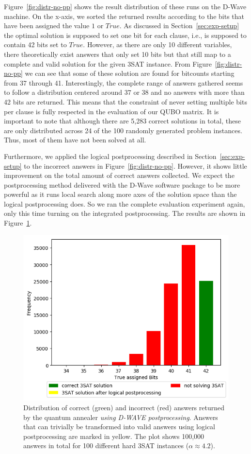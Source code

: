 Figure~\ref{fig:distr-no-pp} shows the result distribution of these runs on the D-Wave machine. On the x-axis, we sorted the returned results according to the bits that have been assigned the value $1$ or $\textit{True}$. As discussed in Section~\ref{sec:exp-setup} the optimal solution is supposed to set one bit for each clause, i.e., is supposed to contain 42 bits set to $\textit{True}$. However, as there are only 10 different variables, there theoretically exist answers that only set 10 bits but that still map to a complete and valid solution for the given 3SAT instance. From Figure~\ref{fig:distr-no-pp} we can see that some of these solution are found for bitcounts starting from 37 through 41. Interestingly, the complete range of answers gathered seems to follow a distribution centered around $37$ or $38$ and no answers with more than 42 bits are returned. This means that the constraint of never setting multiple bits per clause is fully respected in the evaluation of our QUBO matrix. It is important to note that although there are 5,283 correct solutions in total, these are only distributed across 24 of the 100 randomly generated problem instances. Thus,  most of them have not been solved at all.

Furthermore, we applied the logical postprocessing described in Section~\ref{sec:exp-setup} to the incorrect answers in Figure~\ref{fig:distr-no-pp}. However, it shows little improvement on the total amount of correct answers collected. We expect the postprocessing method delivered with the D-Wave software package to be more powerful as it runs local search along more axes of the solution space than the logical postprocessing does. So we ran the complete evaluation experiment again, only this time turning on the integrated postprocessing. The results are shown in Figure~\ref{fig:distr-yes-pp}.

\begin{figure}[t]
\centering
\includegraphics[width=.7\textwidth]{../material_2/Plots/42_4_2_opt_engl_color_mit_transform.png}
\caption{Distribution of correct (green) and incorrect (red) answers returned by the quantum annealer \emph{using D-WAVE postprocessing}. Answers that can trivially be transformed into valid answers using logical postprocessing are marked in yellow. The plot shows 100,000 answers in total for 100 different hard 3SAT instances ($\alpha \approx 4.2$).}
\label{fig:distr-yes-pp}
\end{figure}

